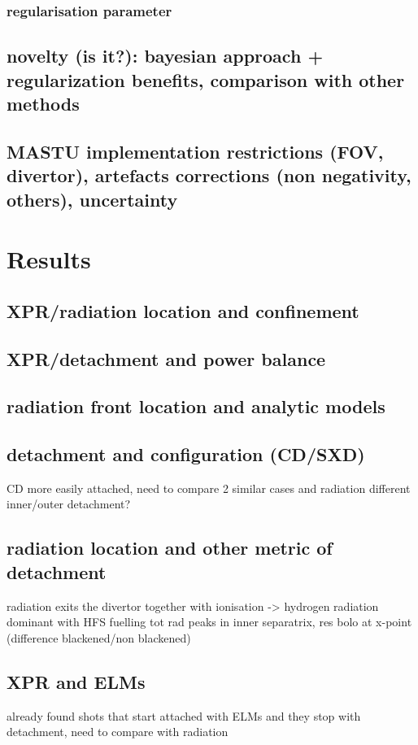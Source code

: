 \subsubsection{regularisation parameter}
\subsection{novelty (is it?): bayesian approach + regularization
benefits, comparison with other methods}
\subsection{MASTU implementation
restrictions (FOV, divertor), artefacts corrections (non negativity, others), uncertainty}

\section{Results}
\subsection{XPR/radiation location and confinement}
\subsection{XPR/detachment and power balance}
\subsection{radiation front location and analytic models}
\subsection{detachment and configuration (CD/SXD)}
CD more easily attached, need to compare 2 similar cases and radiation
different inner/outer detachment?
\subsection{radiation location and other metric of detachment}
radiation exits the divertor together with ionisation -> hydrogen radiation dominant
with HFS fuelling tot rad peaks in inner separatrix, res bolo at x-point (difference blackened/non blackened)
\subsection{XPR and ELMs}
already found shots that start attached with ELMs and they stop with detachment, need to compare with radiation
